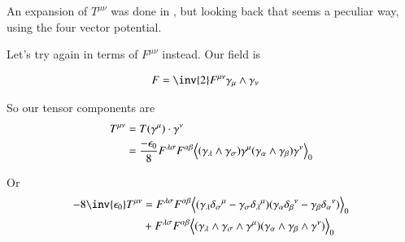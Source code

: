\documentclass{article}
\begin{document}
An expansion of $T^{\mu\nu}$ was done in \cite{PJemstresstensor}, but looking
back that seems a peculiar way, using the four vector potential.

Let's try again in terms of $F^{\mu\nu}$ instead.  Our field is

\begin{align}
F 
&= \inv{2} F^{\mu\nu} \gamma_{\mu} \wedge \gamma_\nu 
\end{align}

So our tensor components are
\begin{align*}
T^{\mu\nu}
&= T(\gamma^\mu) \cdot \gamma^\nu \\
&= \frac{-\epsilon_0}{8} F^{\lambda\sigma} F^{\alpha\beta} 
{\left\langle{{ (\gamma_\lambda \wedge \gamma_\sigma) \gamma^\mu (\gamma_\alpha \wedge \gamma_\beta) \gamma^\nu }}\right\rangle}_{0} \\
\end{align*}

Or
\begin{align*}
-8{\inv{\epsilon_0}} T^{\mu\nu}
&= 
F^{\lambda\sigma} F^{\alpha\beta} 
\gpgradezero{ 
(\gamma_\lambda {\delta_\sigma}^\mu 
-\gamma_\sigma {\delta_\lambda}^\mu)
(\gamma_\alpha {\delta_\beta}^\nu 
-\gamma_\beta {\delta_\alpha}^\nu)
} \\
&+
F^{\lambda\sigma} F^{\alpha\beta} 
\gpgradezero{ (\gamma_\lambda \wedge \gamma_\sigma \wedge \gamma^\mu) (\gamma_\alpha \wedge \gamma_\beta \wedge \gamma^\nu) } \\
\end{align*}
\end{document}
